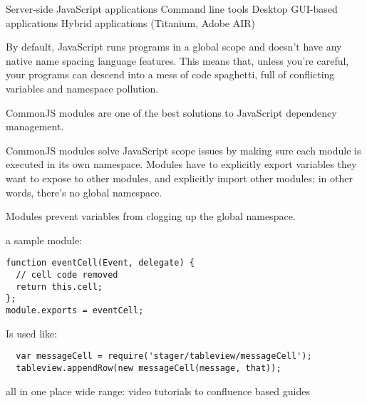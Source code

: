 Server-side JavaScript applications
Command line tools
Desktop GUI-based applications
Hybrid applications (Titanium, Adobe AIR)



By default, JavaScript runs programs in a global scope and doesn't have any native name spacing language features. This means that, unless you're careful, your programs can descend into a mess of code spaghetti, full of conflicting variables and namespace pollution.

CommonJS modules are one of the best solutions to JavaScript dependency management.

CommonJS modules solve JavaScript scope issues by making sure each module is executed in its own namespace. Modules have to explicitly export variables they want to expose to other modules, and explicitly import other modules; in other words, there's no global namespace.

Modules prevent variables from clogging up the global namespace.


a sample module:


\begin{verbatim}
function eventCell(Event, delegate) {
  // cell code removed
  return this.cell;
};
module.exports = eventCell;
\end{verbatim}

Is used like:
\begin{verbatim}
  var messageCell = require('stager/tableview/messageCell');
  tableview.appendRow(new messageCell(message, that));
\end{verbatim}


%
%

all in one place
wide range: video tutorials to confluence based guides

